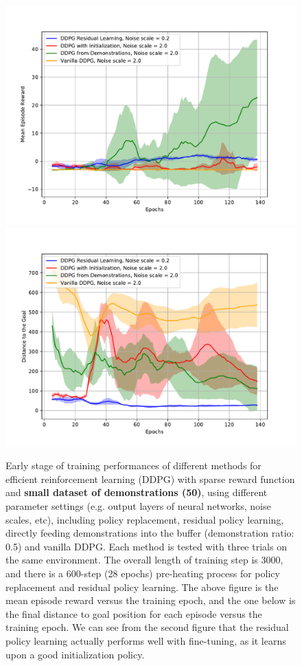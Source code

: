 \documentclass{article}
\begin{document}
\begin{figure}[htbp]
	\centering
	\includegraphics[scale=0.5]{img/3000step_smalldemon1.pdf}
	\includegraphics[scale=0.5]{img/3000step_smalldemon2.pdf}
	\caption{Early stage of training performances of different methods for efficient reinforcement learning (DDPG) with sparse reward function and \textbf{small dataset of demonstrations (50)}, using different parameter settings (e.g. output layers of neural networks, noise scales, etc), including policy replacement, residual policy learning, directly feeding demonstrations into the buffer (demonstration ratio: 0.5) and vanilla DDPG. Each method is tested with three trials on the same environment. The overall length of training step is 3000, and there is a 600-step (28 epochs) pre-heating process for policy replacement and residual policy learning. The above figure is the mean episode reward versus the training epoch, and the one below is the final distance to goal position for each episode versus the training epoch. We can see from the second figure that the residual policy learning actually performs well with fine-tuning, as it learns upon a good initialization policy.}
	\label{fig:comparion6}
\end{figure}
\end{document}
